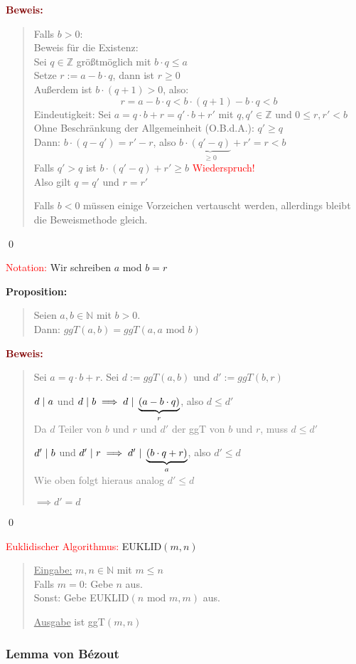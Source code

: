 \documentclass{article}
\newcommand{\smsp}{\phantom{\hspace{3px}}}
\newcommand{\red}[1]{\textcolor{red}{#1}}
\newcommand{\gray}[1]{\textcolor{gray}{#1}}
\newcommand{\dgr}[1]{\textcolor{dgr}{#1}}
\newcommand{\maroon}[1]{\textcolor{maroon}{#1}}
\newcommand{\prop}[1]{\dgr{\textbf{Proposition: }}\begin{quote}#1\end{quote}}
\newcommand{\pr}[1]{\maroon{\textbf{Beweis: }}\begin{quote}#1\end{quote}\qed}
\newcommand{\N}{\mathbb{N}}
\newcommand{\Z}{\mathbb{Z}}
\renewcommand{\st}{\smsp | \smsp}
\begin{document}
\pr{
    Falls $b > 0$:\\
    Beweis für die Existenz:\\
    Sei $q \in \Z$ größtmöglich mit $b \cdot q \leq a$\\
    Setze $r := a - b \cdot q$, dann ist $r \geq 0$\\
    Außerdem ist $b \cdot (q+1) > 0$, also:
    \[
        r = a - b \cdot q < b \cdot (q+1) - b \cdot q < b
    \]
    Eindeutigkeit: Sei $a = q \cdot b + r = q' \cdot b + r'$ mit $q, q' \in \Z$ und $0 \leq r,r' < b$\\
    Ohne Beschränkung der Allgemeinheit (O.B.d.A.): $q' \geq q$\\
    Dann: $b \cdot (q - q') = r' - r$, also $b \cdot \underbrace{(q' - q)}_{\geq 0} + r' = r < b$\\
    Falls $q' > q$ ist $b \cdot (q' - q) + r' \geq b$ \red{Wiederspruch!}\\
    Also gilt $q = q'$ und $r = r'$

    Falls $b < 0$ müssen einige Vorzeichen vertauscht werden, allerdings bleibt die Beweismethode gleich.
}

\red{Notation:} Wir schreiben $a$ mod $b = r$

\prop{
    Seien $a,b \in \N$ mit $b > 0$.\\
    Dann: $ggT(a,b) = ggT(a, a \text{ mod } b)$
}
\pr{
    Sei $a = q \cdot b + r$.
    Sei $d := ggT(a,b)$ und $d' := ggT(b,r)$

    $d \st a$ und $d \st b \implies d \st \underbrace{(a - b \cdot q)}_r$, also $d \leq d'$\\
    \gray{Da $d$ Teiler von $b$ und $r$ und $d'$ der ggT von $b$ und $r$, muss $d \leq d'$}

    $d' \st b$ und $d' \st r \implies d' \st \underbrace{(b \cdot q + r)}_a$, also $d' \leq d$\\
    \gray{Wie oben folgt hieraus analog $d' \leq d$}

    $\implies d' = d$
}

\red{Euklidischer Algorithmus:} EUKLID$(m,n)$
\begin{quote}
    \underline{Eingabe:} $m,n \in \N$ mit $m \leq n$\\
    Falls $m = 0$: Gebe $n$ aus.\\
    Sonst: Gebe EUKLID$(n \text{ mod } m, m)$ aus.

    \underline{Ausgabe} ist ggT$(m,n)$
\end{quote}

\subsubsection{Lemma von Bézout}
\end{document}
